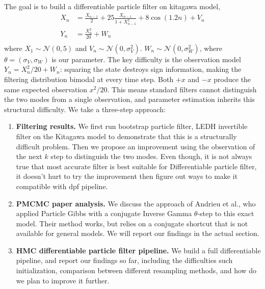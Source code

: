 \documentclass{article}
\begin{document}
The goal is to build a differentiable particle filter on kitagawa model,
\begin{equation}
\begin{split}
X_n &= \frac{X_{n-1}}{2} + 25 \frac{X_{n-1}}{1 + X_{n-1}^2} + 8 \cos(1.2n) + V_n \\
Y_n &= \frac{X_n^2}{20} + W_n \\
\end{split}
\end{equation}
where $ X_1 \sim \mathcal{N}(0, 5)$ and
$ V_n \sim \mathcal{N}(0, \sigma_V^2)$.
$ W_n \sim \mathcal{N}(0, \sigma_W^2)$, where $\theta=(\sigma_V,\sigma_W)$ is our parameter. The key difficulty is the observation model $Y_n = X_n^2/20 + W_n$: squaring the state destroys sign information, making the filtering distribution bimodal at every time step. Both $+x$ and $-x$ produce the same expected observation $x^2/20$. This means standard filters cannot distinguish the two modes from a single observation, and parameter estimation inherits this structural difficulty. We take a three-step approach:
\begin{enumerate}
    \item \textbf{Filtering results.} We first run bootstrap particle filter, LEDH invertible filter on the Kitagawa model to demonstrate that this is a structurally difficult problem. Then we propose an improvement using the observation of the next $k$ step to distinguish the two modes. Even though, it is not always true that most accurate filter is best suitable for Differentiable particle filter, it doesn't hurt to try the improvement then figure out ways to make it compatible with dpf pipeline.

    \item \textbf{PMCMC paper analysis.} We discuss the approach of Andrieu et al.\cite{Andrieu2010}, who applied Particle Gibbs with a conjugate Inverse Gamma $\theta$-step to this exact model. Their method works, but relies on a conjugate shortcut that is not available for general models. We will report our findings in the actual section.
 
     \item \textbf{HMC differentiable particle filter pipeline.} We build a full differentiable pipeline, and report our findings so far, including the difficulties such initialization, comparison between different resampling methods, and how do we plan to improve it further.
     
    \end{enumerate}
\end{document}
